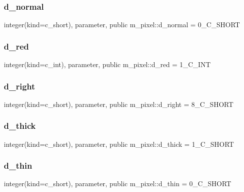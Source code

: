 \subsubsection{\texorpdfstring{d\+\_\+normal}{d\_normal}}
{\footnotesize\ttfamily integer(kind=c\+\_\+short), parameter, public m\+\_\+pixel\+::d\+\_\+normal = 0\+\_\+\+C\+\_\+\+S\+H\+O\+RT}

\mbox{\label{namespacem__pixel_a79a9da737aa4362052e625bf692e4426}} 
\subsubsection{\texorpdfstring{d\+\_\+red}{d\_red}}
{\footnotesize\ttfamily integer(kind=c\+\_\+int), parameter, public m\+\_\+pixel\+::d\+\_\+red = 1\+\_\+\+C\+\_\+\+I\+NT}

\mbox{\label{namespacem__pixel_abdd69f206e03c992f74bc38fdbdc5341}} 
\subsubsection{\texorpdfstring{d\+\_\+right}{d\_right}}
{\footnotesize\ttfamily integer(kind=c\+\_\+short), parameter, public m\+\_\+pixel\+::d\+\_\+right = 8\+\_\+\+C\+\_\+\+S\+H\+O\+RT}

\mbox{\label{namespacem__pixel_a095fd528e2868919dfc3711aa1fea54d}} 
\subsubsection{\texorpdfstring{d\+\_\+thick}{d\_thick}}
{\footnotesize\ttfamily integer(kind=c\+\_\+short), parameter, public m\+\_\+pixel\+::d\+\_\+thick = 1\+\_\+\+C\+\_\+\+S\+H\+O\+RT}

\mbox{\label{namespacem__pixel_acc98e97d1c60df778c0d4035653d24c8}} 
\subsubsection{\texorpdfstring{d\+\_\+thin}{d\_thin}}
{\footnotesize\ttfamily integer(kind=c\+\_\+short), parameter, public m\+\_\+pixel\+::d\+\_\+thin = 0\+\_\+\+C\+\_\+\+S\+H\+O\+RT}

